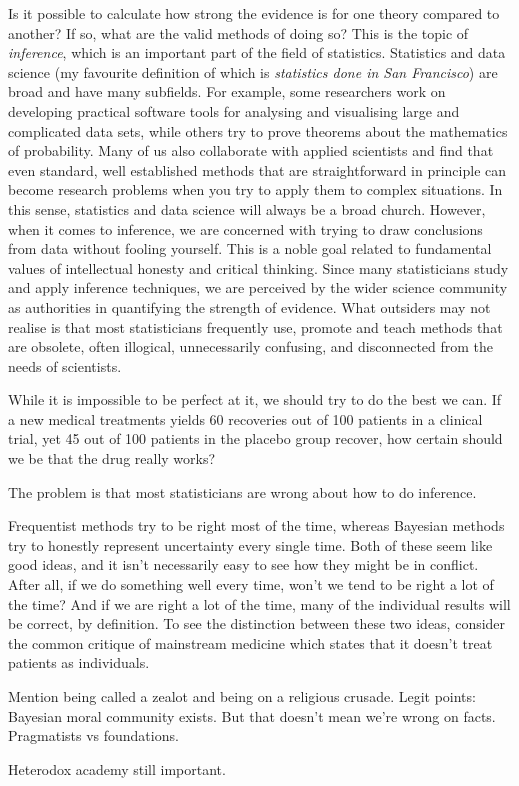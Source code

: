 \documentclass[a4paper, 12pt]{article}
\begin{document}
Is it possible to calculate how strong the evidence is for one theory compared
to another? If so, what are the valid methods of doing so? This is the topic
of {\em inference}, which is an important part of the field of statistics.
Statistics and data science
(my favourite definition of which is {\em statistics done in San Francisco})
are broad and have many subfields. For example, some researchers
work on developing practical software tools for analysing and visualising large and
complicated data sets, while others try to prove theorems about the mathematics
of probability. Many of us also collaborate with applied scientists and find
that even standard, well established methods that are straightforward in
principle can become research problems when you try to apply them to complex
situations. In this sense, statistics and data science will always be a broad church.
However, when it comes to inference, we are concerned with trying to
draw conclusions from data without fooling yourself. This is a noble goal
related to fundamental values of intellectual honesty and critical
thinking. Since many statisticians study and apply inference techniques,
we are perceived by the wider science community as authorities
in quantifying the strength of evidence. What outsiders may not realise is
that most statisticians frequently use, promote and teach methods that are
obsolete, often illogical, unnecessarily confusing, and disconnected from the
needs of scientists.

While
it is impossible to be perfect at it, we should try to do the best
we can.  If a new medical treatments yields 60
recoveries out of 100 patients in a clinical trial, yet 45 out of 100 patients
in the placebo group recover, how certain should we be that the drug really works?



The problem is that most statisticians are wrong about how to do inference.

Frequentist methods try to be right most of the time, whereas Bayesian methods
try to honestly represent uncertainty every single time. Both of these seem
like good ideas, and it isn't necessarily easy to see how they might be in
conflict. After all, if we do something well every time, won't we tend to be
right a lot of the time? And if we are right a lot of the time, many of the
individual results will be correct, by definition.
To see the distinction between these two ideas,
consider the common critique of mainstream medicine which states that it
doesn't treat patients as individuals.


Mention being called a zealot and being on a religious crusade.
Legit points: Bayesian moral community exists. But that doesn't mean we're
wrong on facts. Pragmatists vs foundations.

Heterodox academy still important.
\end{document}
